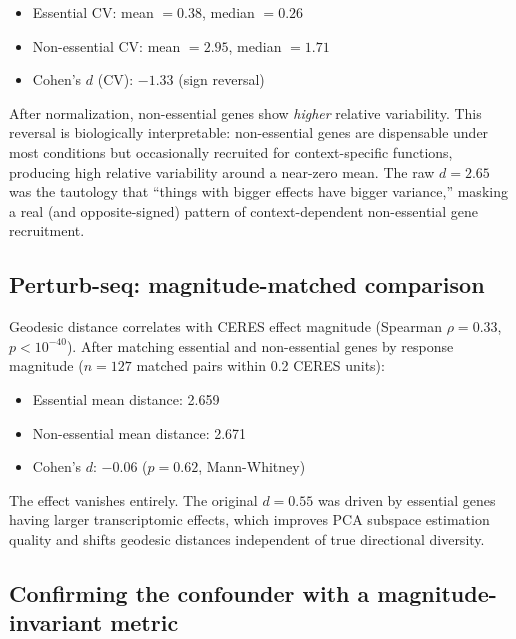 \documentclass[11pt]{article}
\begin{document}
\begin{itemize}
  \item Essential CV: mean $= 0.38$, median $= 0.26$
  \item Non-essential CV: mean $= 2.95$, median $= 1.71$
  \item Cohen's $d$ (CV): $-1.33$ (sign reversal)
\end{itemize}

After normalization, non-essential genes show \emph{higher} relative
variability. This reversal is biologically interpretable: non-essential
genes are dispensable under most conditions but occasionally recruited
for context-specific functions, producing high relative variability
around a near-zero mean. The raw $d = 2.65$ was the tautology that
``things with bigger effects have bigger variance,'' masking a real (and
opposite-signed) pattern of context-dependent non-essential gene
recruitment.

\subsection{Perturb-seq: magnitude-matched comparison}

Geodesic distance correlates with CERES effect magnitude (Spearman $\rho
= 0.33$, $p < 10^{-40}$). After matching essential and non-essential
genes by response magnitude ($n = 127$ matched pairs within 0.2 CERES
units):

\begin{itemize}
  \item Essential mean distance: 2.659
  \item Non-essential mean distance: 2.671
  \item Cohen's $d$: $-0.06$ ($p = 0.62$, Mann-Whitney)
\end{itemize}

The effect vanishes entirely. The original $d = 0.55$ was driven by
essential genes having larger transcriptomic effects, which improves PCA
subspace estimation quality and shifts geodesic distances independent of
true directional diversity.

\subsection{Confirming the confounder with a magnitude-invariant metric}
\end{document}
